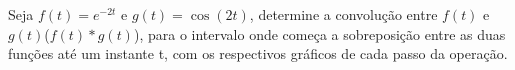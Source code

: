\linespread{1.5}
Seja $f(t) = e^{-2t}$ e $g(t) = \cos{(2t)}$, determine a convolução entre $f(t)$ e $g(t)$($f(t)\ast g(t)$), para o intervalo onde começa a sobreposição entre as duas funções até um instante t, com os respectivos gráficos de cada passo da operação.